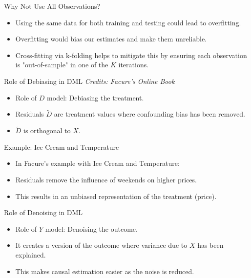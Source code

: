 \documentclass{beamer}
\begin{document}
\begin{frame}{Why Not Use All Observations?}
  \begin{itemize}
    \item Using the same data for both training and testing could lead to overfitting.
    \item Overfitting would bias our estimates and make them unreliable.
    \item Cross-fitting via k-folding helps to mitigate this by ensuring each observation is "out-of-sample" in one of the \( K \) iterations.
  \end{itemize}
\end{frame}

\begin{frame}{Role of Debiasing in DML}
  \textit{Credits: Facure's Online Book}
  \begin{itemize}
    \item Role of \( D \) model: Debiasing the treatment.
    \item Residuals \( \tilde{D} \) are treatment values where confounding bias has been removed.
    \item \( \tilde{D} \) is orthogonal to \( X \).
  \end{itemize}
\end{frame}

\begin{frame}{Example: Ice Cream and Temperature}
  \begin{itemize}
    \item In Facure's example with Ice Cream and Temperature:
    \item Residuals remove the influence of weekends on higher prices.
    \item This results in an unbiased representation of the treatment (price).
  \end{itemize}
\end{frame}

\begin{frame}{Role of Denoising in DML}
  \begin{itemize}
    \item Role of \( Y \) model: Denoising the outcome.
    \item It creates a version of the outcome where variance due to \( X \) has been explained.
    \item This makes causal estimation easier as the noise is reduced.
  \end{itemize}
\end{frame}
\end{document}
